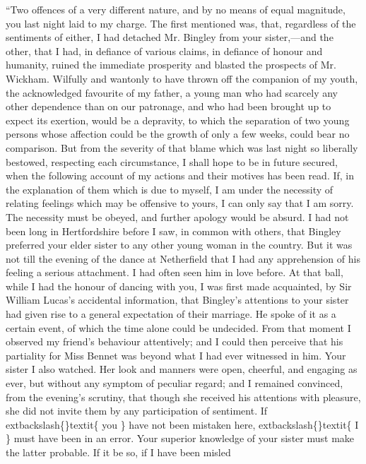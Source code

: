 \documentclass[10pt]{book}
\begin{document}
   “Two offences of a very different nature, and by no means of equal
magnitude, you last night laid to my charge. The first mentioned was,
that, regardless of the sentiments of either, I had detached Mr. Bingley
from your sister,—and the other, that I had, in defiance of various
claims, in defiance of honour and humanity, ruined the immediate
prosperity and blasted the prospects of Mr. Wickham. Wilfully and
wantonly to have thrown off the companion of my youth, the acknowledged
favourite of my father, a young man who had scarcely any other
dependence than on our patronage, and who had been brought up to expect
its exertion, would be a depravity, to which the separation of two young
persons whose affection could be the growth of only a few weeks, could
bear no comparison. But from the severity of that blame which was last
night so liberally bestowed, respecting each circumstance, I shall hope
to be in future secured, when the following account of my actions and
their motives has been read. If, in the explanation of them which is due
to myself, I am under the necessity of relating feelings which may be
offensive to yours, I can only say that I am sorry. The necessity must
be obeyed, and further apology would be absurd. I had not been long in
Hertfordshire before I saw, in common with others, that Bingley
preferred your elder sister to any other young woman in the country. But
it was not till the evening of the dance at Netherfield that I had any
apprehension of his feeling a serious attachment. I had often seen him
in love before. At that ball, while I had
   the honour of dancing with
you, I was first made acquainted, by Sir William Lucas’s accidental
information, that Bingley’s attentions to your sister had given rise to
a general expectation of their marriage. He spoke of it as a certain
event, of which the time alone could be undecided. From that moment I
observed my friend’s behaviour attentively; and I could then perceive
that his partiality for Miss Bennet was beyond what I had ever witnessed
in him. Your sister I also watched. Her look and manners were open,
cheerful, and engaging as ever, but without any symptom of peculiar
regard; and I remained convinced, from the evening’s scrutiny, that
though she received his attentions with pleasure, she did not invite
them by any participation of sentiment. If
   	extbackslash\{\}textit\{
    you
   \}
   have not been mistaken
here,
   	extbackslash\{\}textit\{
    I
   \}
   must have been in an error. Your superior knowledge of your
sister must make the latter probable. If it be so, if I have been misled
\end{document}
